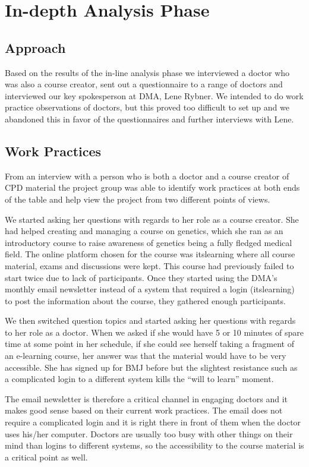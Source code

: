 \section{In-depth Analysis Phase}
\subsection{Approach}
\label{indepth-approach}
Based on the results of the in-line analysis phase we interviewed a doctor who was also a course creator, sent out a questionnaire to a range of doctors and interviewed our key spokesperson at DMA, Lene Rybner. We intended to do work practice observations of doctors, but this proved too difficult to set up and we abandoned this in favor of the questionnaires and further interviews with Lene.

\subsection{Work Practices}
From an interview with a person who is both a doctor and a course creator of CPD material the project group was able to identify work practices at both ends of the table and help view the project from two different points of views.

We started asking her questions with regards to her role as a course creator. She had helped creating and managing a course on genetics, which she ran as an introductory course to raise awareness of genetics being a fully fledged medical field. The online platform chosen for the course was itslearning where all course material, exams and discussions were kept. This course had previously failed to start twice due to lack of participants.
Once they started using the DMA’s monthly email newsletter instead of a system that required a login (itslearning) to post the information about the course, they gathered enough participants.

We then switched question topics and started asking her questions with regards to her role as a doctor. When we asked if she would have 5 or 10 minutes of spare time at some point in her schedule, if she could see herself taking a fragment of an e-learning course, her answer was that the material would have to be very accessible. She has signed up for BMJ before but the slightest resistance such as a complicated login to a different system kills the “will to learn” moment.

The email newsletter is therefore a critical channel in engaging doctors and it makes good sense based on their current work practices. The email does not require a complicated login and it is right there in front of them when the doctor uses his/her computer. Doctors are usually too busy with other things on their mind than logins to different systems, so the accessibility to the course material is a critical point as well.

